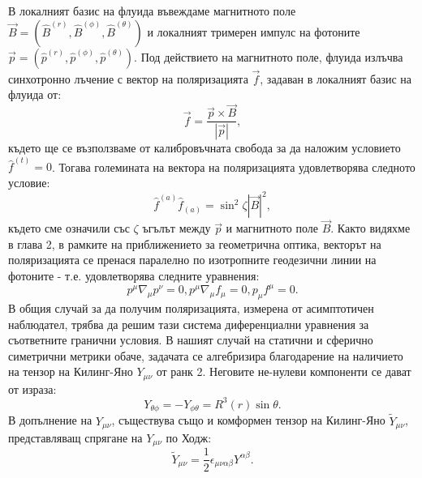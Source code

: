 В локалният базис на флуида въвеждаме магнитното поле $\vec{B} = (\hat{B}^{(r)},\hat{B}^{(\phi)},\hat{B}^{(\theta)})$ и локалният тримерен импулс на фотоните $\vec{p} = \left(\hat{p}^{(r)},\hat{p}^{(\phi)},\hat{p}^{(\theta)}\right)$. Под действието на магнитното поле, флуида излъчва синхотронно лъчение с вектор на поляризацията $\vec{f}$, задаван в локалният базис на флуида от:
\begin{equation}
	\vec{f} = \frac{\vec{p}\times\vec{B}}{|\vec{p}|},
\end{equation}
където ще се възползваме от калибровъчната свобода за да наложим условието $\hat{f}^{(t)} = 0$. Тогава големината на вектора на поляризацията удовлетворява следното условие:
\begin{equation}
	\hat{f}^{(a)}\hat{f}_{(a)} = \sin^2\zeta|\vec{B}|^2,
\end{equation}
където сме означили със $\zeta$ ъгълът между $\vec{p}$ и магнитното поле $\vec{B}$. Както видяхме в глава 2, в рамките на приближението за геометрична оптика, векторът на поляризацията се пренася паралелно по изотропните геодезични линии на фотоните - т.е. удовлетворява следните уравнения:
\begin{subequations}
	\begin{equation}
		p^\mu\nabla_\mu p^\nu = 0,
	\end{equation}
	\begin{equation}
		p^\mu\nabla_\mu f_\mu = 0,
	\end{equation}
	\begin{equation}
		p_\mu f^\mu = 0.
	\end{equation}
\end{subequations}
В общия случай за да получим поляризацията, измерена от асимптотичен наблюдател, трябва да решим тази система диференциални уравнения за съответните гранични условия. В нашият случай на статични и сферично симетрични метрики обаче, задачата се алгебризира благодарение на наличието на тензор на Килинг-Яно $Y_{\mu\nu}$ от ранк 2. Неговите не-нулеви компоненти се дават от израза:
\begin{equation}
	Y_{\theta\phi} = -Y_{\phi\theta} = R^3(r)\sin\theta.
\end{equation} 
В допълнение на $Y_{\mu\nu}$, съществува също и комформен тензор на Килинг-Яно $\tilde{Y}_{\mu\nu}$, представляващ спрягане на $Y_{\mu\nu}$ по Ходж:
\begin{equation}
	\tilde{Y}_{\mu\nu} = \frac{1}{2}\epsilon_{\mu\nu\alpha\beta}Y^{\alpha\beta}.
\end{equation}
